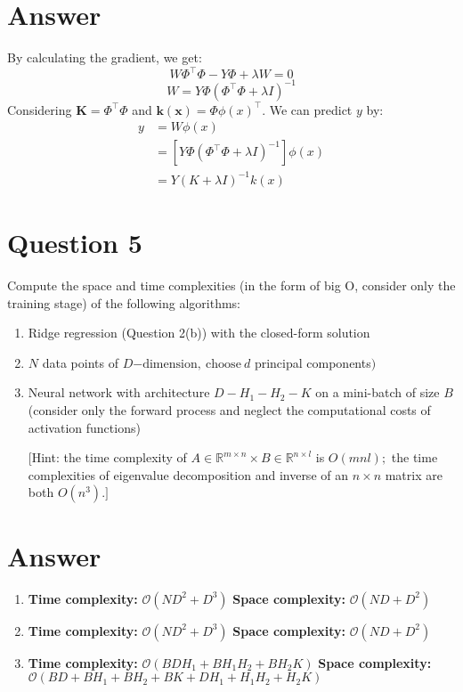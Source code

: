 \documentclass[
	12pt, %
]{fphw}
\begin{document}
\section*{Answer}
By calculating the gradient, we get:
\begin{equation*}
	W \Phi^{\top}\Phi - Y\Phi + \lambda W = 0
\end{equation*}
\begin{equation*}
	W = Y \Phi (\Phi^{\top}\Phi + \lambda I)^{-1}
\end{equation*}
Considering $\mathbf{K} = \Phi^\top\Phi$ and $\mathbf{k}(\mathbf{x}) = \Phi\phi(x)^\top$.
We can predict $y$ by:
\begin{equation*}
	\begin{aligned}
		y &= W\phi(x) \\
		  &= [Y \Phi (\Phi^{\top}\Phi + \lambda I)^{-1}]\phi(x) \\
		  &= Y(K + \lambda I)^{-1}k(x)
	\end{aligned}
\end{equation*}
\section*{Question 5}

\begin{problem}
	Compute the space and time complexities (in the form of big O, consider only the training
stage) of the following algorithms:
\begin{enumerate}
\item Ridge regression (Question 2(b)) with the closed-form solution 
\item $N$ data points of $D\mathrm{- dimension, ~choose~}d$ principal components$) $
\item Neural network with architecture $D-H_1-H_2-K$ on a mini-batch of size $B$ (consider only
the forward process and neglect the computational costs of activation functions) 

[Hint: the time complexity of $A\in\mathbb{R}^{m\times n}\times B\in\mathbb{R}^{n\times l}$ is $O(mnl);$ the time complexities of
 eigenvalue decomposition and inverse of an $n\times n$ matrix are both $O(n^3).]$
\end{enumerate}
\end{problem}
\section*{Answer}
\begin{enumerate}
	\item \textbf{Time complexity:} ${\mathcal O}(ND^{2}+D^{3})$ \textbf{Space complexity:} ${\mathcal O}(ND+D^{2})$
	\item \textbf{Time complexity:} ${\mathcal O}(ND^{2}+D^{3})$ \textbf{Space complexity:} ${\mathcal O}(ND+D^{2})$
	\item \textbf{Time complexity:} ${\mathcal O}(BDH_1+BH_1H_2+BH_2K)$ \textbf{Space complexity:} ${\mathcal O}(BD+BH_1+BH_2+BK+DH_1+H_1H_2+H_2K)$
\end{enumerate}
\end{document}

